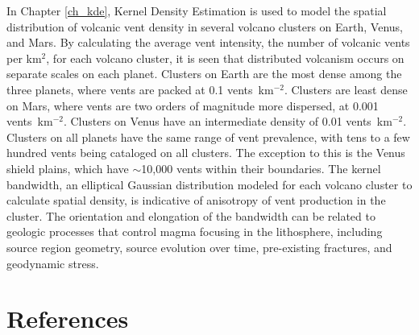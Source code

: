In Chapter \ref{ch_kde}, Kernel Density Estimation is used to model the spatial distribution of volcanic vent density in several volcano clusters on Earth, Venus, and Mars. By calculating the average vent intensity, the number of volcanic vents per km$^2$, for each volcano cluster, it is seen that distributed volcanism occurs on separate scales on each planet. Clusters on Earth are the most dense among the three planets, where vents are packed at 0.1 vents~km$^{-2}$. Clusters are least dense on Mars, where vents are two orders of magnitude more dispersed, at 0.001 vents~km$^{-2}$. Clusters on Venus have an intermediate density of 0.01 vents~km$^{-2}$. Clusters on all planets have the same range of vent prevalence, with tens to a few hundred vents being cataloged on all clusters. The exception to this is the Venus shield plains, which have $\sim$10,000 vents within their boundaries. The kernel bandwidth, an elliptical Gaussian distribution modeled for each volcano cluster to calculate spatial density, is indicative of anisotropy of vent production in the cluster. The orientation and elongation of the bandwidth can be related to geologic processes that control magma focusing in the lithosphere, including source region geometry, source evolution over time, pre-existing fractures, and geodynamic stress.


\section{References}
